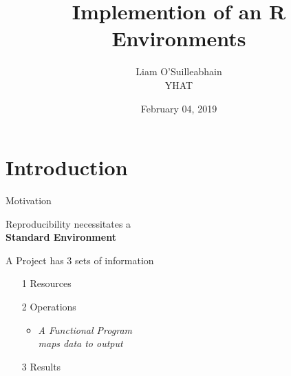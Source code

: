 \documentclass{beamer}
\title{Implemention of an R Environments}
\author{Liam O'Suilleabhain\\ \bigskip YHAT}
\date{February 04, 2019}
\begin{document}
\frame{\titlepage}




\section*{Introduction}

\begin{frame}{Motivation}
\begin{minipage}{0.6\textwidth}

\begin{center} Reproducibility necessitates a\\ \textbf{Standard Environment}\end{center} 
\bigskip

A Project has 3 sets of information
\bigskip
	
\begin{itemize}
\item[1] Resources
\item[2] Operations
\begin{small}
\begin{itemize}
\item \emph{A Functional Program \\ maps data to output}
\end{itemize}
\end{small}
\item[3] Results
\end{itemize}


\end{minipage}
\end{frame}
\end{document}

